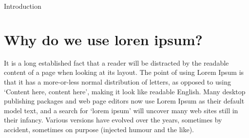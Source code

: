 \begin{section}{Introduction}
\end{section}


\section{Why do we use loren ipsum?} %


It is a long established fact that a reader will be distracted by the readable content of a page when looking at its layout. The point of using Lorem Ipsum is that it has a more-or-less normal distribution of letters, as opposed to using `Content here, content here', making it look like readable English. Many desktop publishing packages and web page editors now use Lorem Ipsum as their default model text, and a search for `lorem ipsum' will uncover many web sites still in their infancy. Various versions have evolved over the years, sometimes by accident, sometimes on purpose (injected humour and the like).

